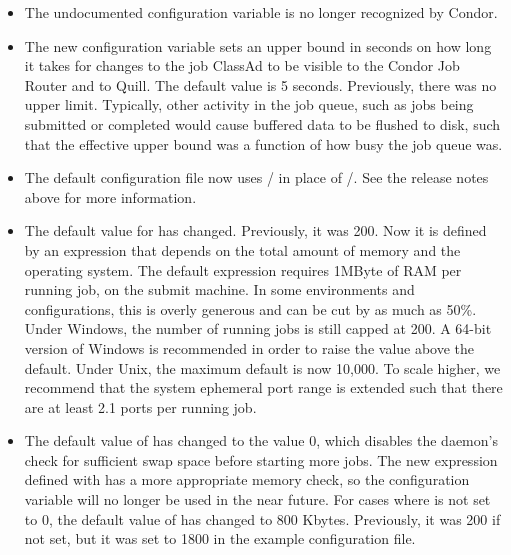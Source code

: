 \begin{itemize}

\item The undocumented configuration variable 
   is no longer recognized by Condor.

\item The new configuration variable 
   sets an
  upper bound in seconds on how long it takes for changes to the job
  ClassAd to be visible to the Condor Job Router and to Quill.
  The default value is 5 seconds.
  Previously, there was no upper limit.  Typically, other activity in
  the job queue, such as jobs being submitted or completed would cause
  buffered data to be flushed to disk, such that the effective upper bound was
  a function of how busy the job queue was.

\item The default configuration file now uses
  / in place of
  /.  See the release notes above
  for more information.

\item The default value for  has changed.
  Previously, it was 200.  Now it is defined by an expression that depends 
  on the total amount of memory and the operating system.  The default
  expression requires 1MByte of RAM per running job, on the submit machine.
  In some environments and configurations, this is overly
  generous and can be cut by as much as 50\%.  Under Windows, the
  number of running jobs is still capped at 200.
  A 64-bit version of Windows  is recommended in order to raise the value
  above the default.
  Under Unix, the maximum default is now 10,000.  To scale higher, we
  recommend that the system ephemeral port range is extended
  such that there are at least 2.1 ports per running job.

\item The default value of  has changed to
  the value 0, which
  disables the  daemon's check for sufficient swap space
  before starting more jobs.  The new expression defined with 
   has a more appropriate memory check, so
  the configuration variable  will no longer
  be used in the near future.
  For cases where 
   is not set to 0, the default value
  of  has changed to 800 Kbytes.
  Previously, it was 200 if not set,
  but it was set to 1800 in the example configuration file.


\end{itemize}
